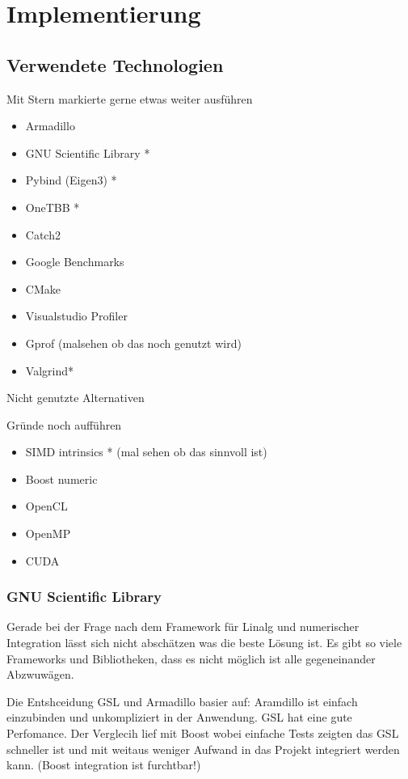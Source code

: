 \chapter{Implementierung}

\section{Verwendete Technologien}


Mit Stern markierte gerne etwas weiter ausführen
\begin{itemize}
    \item Armadillo
    \item GNU Scientific Library *
    \item Pybind (Eigen3) *
    \item OneTBB *
    \item Catch2
    \item Google Benchmarks
    \item CMake
    \item Visualstudio Profiler
    \item Gprof (malsehen ob das noch genutzt wird)
    \item Valgrind*
\end{itemize}



Nicht genutzte Alternativen

Gründe noch aufführen
\begin{itemize}
    \item SIMD intrinsics * (mal sehen ob das sinnvoll ist)
    \item Boost numeric
    \item OpenCL
    \item OpenMP
    \item CUDA
\end{itemize}

\subsection{GNU Scientific Library}

Gerade bei der Frage nach dem Framework für Linalg und numerischer Integration lässt sich nicht abschätzen was die beste Lösung ist. Es gibt
so viele Frameworks und Bibliotheken, dass es nicht möglich ist alle gegeneinander Abzwuwägen.

Die Entshceidung GSL und Armadillo basier auf: Aramdillo ist einfach einzubinden und unkompliziert in der Anwendung.
GSL hat eine gute Perfomance. Der Verglecih lief mit Boost wobei einfache Tests zeigten das GSL schneller ist und mit weitaus weniger Aufwand in das Projekt integriert werden kann.
(Boost integration ist furchtbar!)


